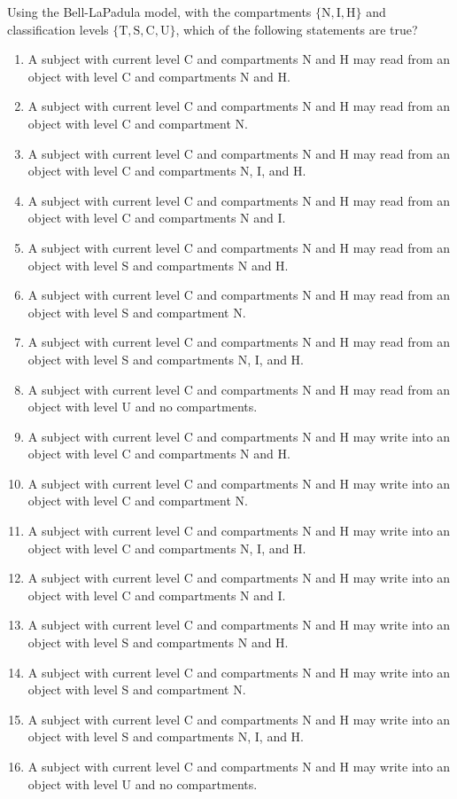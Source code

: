 \begin{chapterEnumerate}
\item
Using the Bell-LaPadula model, with the compartments $\lbrace \textrm{N}, \textrm{I}, \textrm{H}
\rbrace$ and classification levels $\lbrace \textrm{T}, \textrm{S}, \textrm{C}, \textrm{U} \rbrace$, which of
the following statements are true?
\begin{enumerate}
\item
A subject with current level C and compartments N and H may
read from an object with level C and compartments N and H.
\item
A subject with current level C and compartments N and H may
read from an object with level C and compartment N.
\item
A subject with current level C and compartments N and H may
read from an object with level C and compartments N, I, and H.
\item
A subject with current level C and compartments N and H may
read from an object with level C and compartments N and  I.
\item
A subject with current level C and compartments N and H may
read from an object with level S and compartments N and H.
\item
A subject with current level C and compartments N and H may
read from an object with level S and compartment N.
\item
A subject with current level C and compartments N and H may
read from an object with level S and compartments N, I, and H.
\item
A subject with current level C and compartments N and H may
read from an object with level U and no compartments.
\item
A subject with current level C and compartments N and H may
write into an object with level C and compartments N and H.
\item
A subject with current level C and compartments N and H may
write into an object with level C and compartment N.
\item
A subject with current level C and compartments N and H may
write into an object with level C and compartments N, I, and H.
\item
A subject with current level C and compartments N and H may
write into an object with level C and compartments N and  I.
\item
A subject with current level C and compartments N and H may
write into an object with level S and compartments N and H.
\item
A subject with current level C and compartments N and H may
write into an object with level S and compartment N.
\item
A subject with current level C and compartments N and H may
write into an object with level S and compartments N, I, and H.
\item
A subject with current level C and compartments N and H may
write into an object with level U and no compartments.
\end{enumerate}


\end{chapterEnumerate}
